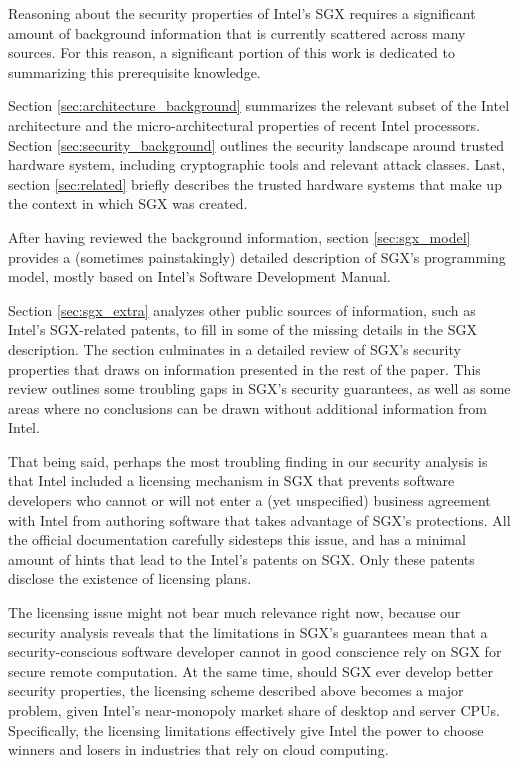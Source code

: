 \label{sec:sgx_intro_outline}

Reasoning about the security properties of Intel's SGX requires a significant
amount of background information that is currently scattered across many
sources. For this reason, a significant portion of this work is dedicated to
summarizing this prerequisite knowledge.

Section \ref{sec:architecture_background} summarizes the relevant subset of the
Intel architecture and the micro-architectural properties of recent Intel
processors. Section \ref{sec:security_background} outlines the security
landscape around trusted hardware system, including cryptographic tools and
relevant attack classes. Last, section \ref{sec:related} briefly describes the
trusted hardware systems that make up the context in which SGX was created.

After having reviewed the background information, section \ref{sec:sgx_model}
provides a (sometimes painstakingly) detailed description of SGX's programming
model, mostly based on Intel's Software Development Manual.

Section \ref{sec:sgx_extra} analyzes other public sources of information, such
as Intel's SGX-related patents, to fill in some of the missing details in the
SGX description. The section culminates in a detailed review of SGX's security
properties that draws on information presented in the rest of the paper. This
review outlines some troubling gaps in SGX's security guarantees, as well as
some areas where no conclusions can be drawn without additional information
from Intel.

That being said, perhaps the most troubling finding in our security analysis is
that Intel included a licensing mechanism in SGX that prevents software
developers who cannot or will not enter a (yet unspecified) business agreement
with Intel from authoring software that takes advantage of SGX's protections.
All the official documentation carefully sidesteps this issue, and has a
minimal amount of hints that lead to the Intel's patents on SGX. Only these
patents disclose the existence of licensing plans.

The licensing issue might not bear much relevance right now, because our
security analysis reveals that the limitations in SGX's guarantees mean that a
security-conscious software developer cannot in good conscience rely on SGX for
secure remote computation. At the same time, should SGX ever develop better
security properties, the licensing scheme described above becomes a major
problem, given Intel's near-monopoly market share of desktop and server CPUs.
Specifically, the licensing limitations effectively give Intel the power to
choose winners and losers in industries that rely on cloud computing.
